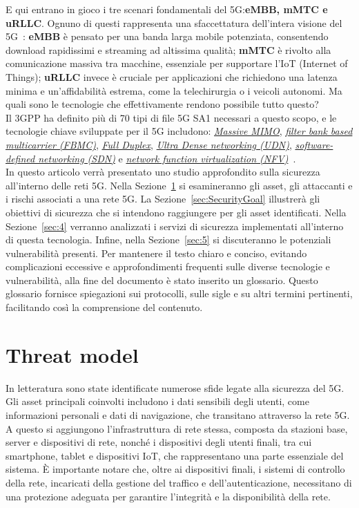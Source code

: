\documentclass[english]{article}
\begin{document}
E qui entrano in gioco i tre scenari fondamentali del 5G:\@ \textbf{eMBB, mMTC
	e uRLLC}. Ognuno di questi rappresenta una sfaccettatura dell'intera visione
del 5G~\cite{Ji2018Overview}: \textbf{eMBB} è pensato per una banda larga
mobile potenziata, consentendo download rapidissimi e streaming ad altissima
qualità; \textbf{mMTC} è rivolto alla comunicazione massiva tra macchine,
essenziale per supportare l’IoT (Internet of Things); \textbf{uRLLC} invece è
cruciale per applicazioni che richiedono una latenza minima e un'affidabilità
estrema, come la telechirurgia o i veicoli autonomi. Ma quali sono le
tecnologie che effettivamente rendono possibile tutto questo? \\ \sloppy Il
3GPP ha definito più di 70 tipi di file 5G SA1 necessari a questo scopo, e le
tecnologie chiave sviluppate per il 5G includono:
\textit{\hyperlink{MIMO}{Massive MIMO}}, \textit{\hyperlink{FBMC}{filter bank
		based multicarrier (FBMC)}}, \textit{\hyperlink{FullDuplex}{Full Duplex}},
\textit{\hyperlink{UDN}{Ultra Dense networking (UDN)}},
\textit{\hyperlink{SDN}{software-defined networking (SDN)}} e
\textit{\hyperlink{NFV}{network function virtualization
		(NFV)}}~\cite{Ji2018Overview}. \\ In questo articolo verrà presentato uno
studio approfondito sulla sicurezza all'interno delle reti 5G. Nella
Sezione~\ref{sec:ThreatModel} si esamineranno gli asset, gli attaccanti e i
rischi associati a una rete 5G. La Sezione~\ref{sec:SecurityGoal} illustrerà
gli obiettivi di sicurezza che si intendono raggiungere per gli asset
identificati. Nella Sezione~\ref{sec:4} verranno analizzati i servizi di
sicurezza implementati all'interno di questa tecnologia. Infine, nella
Sezione~\ref{sec:5} si discuteranno le potenziali vulnerabilità presenti. Per
mantenere il testo chiaro e conciso, evitando complicazioni eccessive e
approfondimenti frequenti sulle diverse tecnologie e vulnerabilità, alla fine
del documento è stato inserito un glossario. Questo glossario fornisce
spiegazioni sui protocolli, sulle sigle e su altri termini pertinenti,
facilitando così la comprensione del contenuto.
\section{Threat model}\label{sec:ThreatModel}
In letteratura sono state identificate numerose sfide legate alla sicurezza del
5G. Gli asset principali coinvolti includono i dati sensibili degli utenti,
come informazioni personali e dati di navigazione, che transitano attraverso la
rete 5G. A questo si aggiungono l'infrastruttura di rete stessa, composta da
stazioni base, server e dispositivi di rete, nonché i dispositivi degli utenti
finali, tra cui smartphone, tablet e dispositivi IoT, che rappresentano una
parte essenziale del sistema. È importante notare che, oltre ai dispositivi
finali, i sistemi di controllo della rete, incaricati della gestione del
traffico e dell'autenticazione, necessitano di una protezione adeguata per
garantire l'integrità e la disponibilità della rete.
\end{document}
